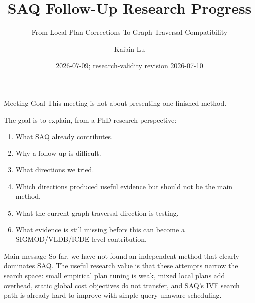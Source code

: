 \documentclass[aspectratio=169,10pt]{beamer}
\title[SAQ Follow-Up Progress]{SAQ Follow-Up Research Progress}
\subtitle{From Local Plan Corrections To Graph-Traversal Compatibility}
\author{Kaibin Lu}
\institute{PhD Research Meeting}
\date{2026-07-09; research-validity revision 2026-07-10}
\begin{document}
\begin{frame}
  \titlepage
\end{frame}

\begin{frame}[fragile]{Meeting Goal}
\small
This meeting is not about presenting one finished method.

\vspace{0.6em}
The goal is to explain, from a PhD research perspective:
\begin{enumerate}
  \item What SAQ already contributes.
  \item Why a follow-up is difficult.
  \item What directions we tried.
  \item Which directions produced useful evidence but should not be the main method.
  \item What the current graph-traversal direction is testing.
  \item What evidence is still missing before this can become a SIGMOD/VLDB/ICDE-level contribution.
\end{enumerate}

\vspace{0.4em}
\begin{block}{Main message}
\small
So far, we have not found an independent method that clearly dominates SAQ.
The useful research value is that these attempts narrow the search space:
small empirical plan tuning is weak, mixed local plans add overhead, static
global cost objectives do not transfer, and SAQ's IVF search path is already
hard to improve with simple query-unaware scheduling.
\end{block}
\end{frame}
\end{document}
